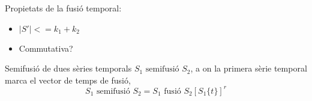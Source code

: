 Propietats de la fusió temporal:
\begin{itemize}
\item $|S'| <= k_1 + k_2$
\item Commutativa?
\end{itemize}



Semifusió de dues sèries temporals $S_1 \text{ semifusió } S_2$, a on la primera sèrie temporal marca el vector de temps de fusió, 
\[
S_1 \text{ semifusió } S_2 = S_1 \text{ fusió } S_2[S_1\{t\}]^r
\]


















